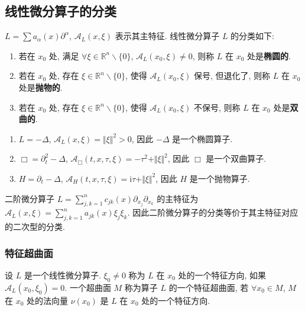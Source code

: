 \documentclass[11pt]{ctexart}[UTF8]
\begin{document}
\subsection{线性微分算子的分类}
$L = \sum\limits a_{\alpha}(x) \partial^{\alpha}$, $\mathscr{A}_{L}(x,\xi)$ 表示其主特征. 线性微分算子 $L$ 的分类如下:
\begin{enumerate}
    \item 若在 $x_{0}$ 处, 满足 $\forall \xi \in \mathbb{R}^{n}\backslash \{0\}$, $\mathscr{A}_{L}(x_{0},\xi) \neq 0$, 则称 $L$ 在 $x_{0}$ 处是\textbf{椭圆的}.
    \item 若在 $x_{0}$ 处, 存在 $\xi \in \mathbb{R}^{n}\backslash \{0\}$, 使得 $\mathscr{A}_{L}(x_{0},\xi)$ 保号, 但退化了, 则称 $L$ 在 $x_{0}$ 处是\textbf{抛物的}.
    \item 若在 $x_{0}$ 处, 存在 $\xi \in \mathbb{R}^{n}\backslash \{0\}$, 使得 $\mathscr{A}_{L}(x_{0},\xi)$ 不保号, 则称 $L$ 在 $x_{0}$ 处是\textbf{双曲的}.
\end{enumerate}
\begin{example}\leavevmode
    \begin{enumerate}
        \item $L = -\Delta$, $\mathscr{A}_{L}(x,\xi) = \Vert\xi\Vert^2 > 0$, 因此 $-\Delta$ 是一个椭圆算子.\\
        \item $\Box = \partial_t^2 - \Delta$, $\mathscr{A}_\Box(t,x,\tau,\xi) = -\tau^2 + \Vert\xi\Vert^2$, 因此 $\Box$ 是一个双曲算子.\\
        \item $H = \partial_t - \Delta$, $\mathscr{A}_H(t,x,\tau,\xi) = \mathrm{i}\tau + \Vert\xi\Vert^2$, 因此 $H$ 是一个抛物算子.
    \end{enumerate}
\end{example}
二阶微分算子 $L = \sum\limits_{j,k=1}^{n} c_{jk}(x) \partial_{x_j} \partial_{x_k} $ 的主特征为 $\mathscr{A}_L(x,\xi) = \sum\limits_{j,k=1}^{n} a_{jk}(x) \xi_j \xi_k$. 
因此二阶微分算子的分类等价于其主特征对应的二次型的分类.

\subsubsection*{特征超曲面}
\begin{definition}[特征超曲面]
    设 $L$ 是一个线性微分算子. $\xi_{0} \neq 0$ 称为 $L$ 在 $x_{0}$ 处的一个特征方向, 如果 $\mathscr{A}_L(x_{0},\xi_{0}) = 0$. 一个超曲面 $M$ 称为算子 $L$ 的一个特征超曲面, 
    若 $\forall x_{0} \in M$, $M$ 在 $x_{0}$ 处的法向量 $\nu(x_{0})$ 是 $L$ 在 $x_{0}$ 处的一个特征方向.
\end{definition}
\end{document}
